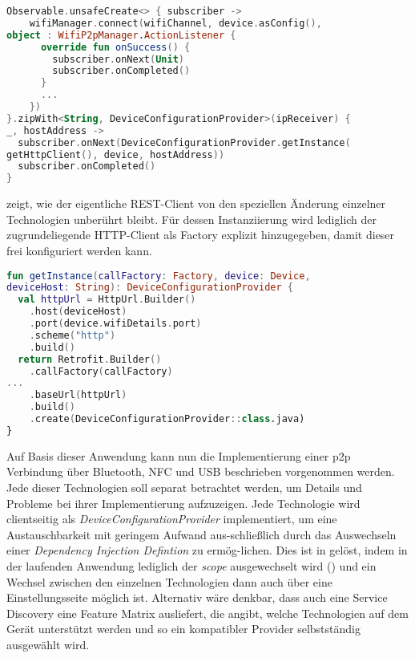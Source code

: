         \begin{lstlisting}[frame=bt, label={lst:wifi:rest}, language=Kotlin, caption=Asynchrones Warten für Wi-Fi Direct Verbindung (Clientcode in Kotlin)]
Observable.unsafeCreate<> { subscriber ->
    wifiManager.connect(wifiChannel, device.asConfig(),
object : WifiP2pManager.ActionListener {
      override fun onSuccess() {
        subscriber.onNext(Unit)
        subscriber.onCompleted()
      }
      ...
    })
}.zipWith<String, DeviceConfigurationProvider>(ipReceiver) {
_, hostAddress ->
  subscriber.onNext(DeviceConfigurationProvider.getInstance(
getHttpClient(), device, hostAddress))
  subscriber.onCompleted()
}
        \end{lstlisting}
        
         zeigt, wie der eigentliche REST-Client von den speziellen Änderung einzelner Technologien unberührt bleibt. Für dessen Instanziierung wird lediglich der zugrundeliegende HTTP-Client als Factory explizit hinzugegeben, damit dieser frei konfiguriert werden kann.
        
        \begin{lstlisting}[frame=bt, label={lst:wifi:client}, language=Kotlin, caption=REST-Client Instanziierung (Clientcode in Kotlin)]
fun getInstance(callFactory: Factory, device: Device,
deviceHost: String): DeviceConfigurationProvider {
  val httpUrl = HttpUrl.Builder()
    .host(deviceHost)
    .port(device.wifiDetails.port)
    .scheme("http")
    .build()
  return Retrofit.Builder()
    .callFactory(callFactory)
...
    .baseUrl(httpUrl)
    .build()
    .create(DeviceConfigurationProvider::class.java)
}
        \end{lstlisting}
        
        Auf Basis dieser Anwendung kann nun die Implementierung einer p2p Verbindung über Bluetooth, NFC und USB beschrieben vorgenommen werden. Jede dieser Technologien soll separat betrachtet werden, um Details und Probleme bei ihrer Implementierung aufzuzeigen. Jede Technologie wird clientseitig als {\it DeviceConfigurationProvider} implementiert, um eine Austauschbarkeit mit geringem Aufwand aus-schließlich durch das Auswechseln einer {\it Dependency Injection Defintion} zu ermög-\linebreak lichen. Dies ist in  gelöst, indem in der laufenden Anwendung lediglich der {\it scope} ausgewechselt wird () und ein Wechsel zwischen den einzelnen Technologien dann auch über eine Einstellungsseite möglich ist. Alternativ wäre denkbar, dass auch eine Service Discovery eine Feature Matrix ausliefert, die angibt, welche Technologien auf dem Gerät unterstützt werden und so ein kompatibler Provider selbstständig ausgewählt wird.
        
